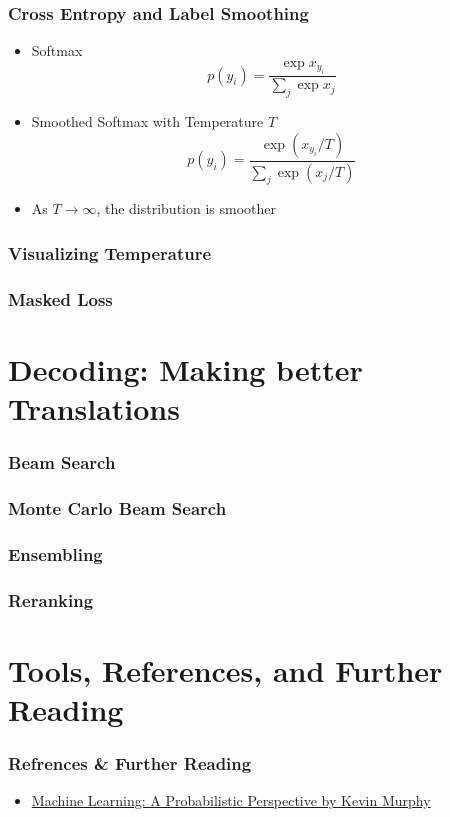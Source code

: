 \documentclass{beamer}
\begin{document}
\begin{frame}
\frametitle{Cross Entropy and Label Smoothing}
\begin{itemize}
  \item Softmax
  \begin{equation*}
    p(y_i) = \frac{\exp x_{y_i}}{\sum_j \exp x_j}
  \end{equation*}
  \item Smoothed Softmax with Temperature $T$
  \begin{equation*}
    p(y_i) = \frac{\exp \left(x_{y_i} / T \right)}{\sum_j \exp \left(x_j / T \right)}
  \end{equation*}
  \item As $T \to \infty$, the distribution is smoother
\end{itemize}
\end{frame}

\begin{frame}
\frametitle{Visualizing Temperature}

\end{frame}

\begin{frame}
\frametitle{Masked Loss}

\end{frame}


\section{Decoding: Making better Translations}

\begin{frame}
\frametitle{Beam Search}

\end{frame}

\begin{frame}
\frametitle{Monte Carlo Beam Search}

\end{frame}

\begin{frame}
\frametitle{Ensembling}

\end{frame}

\begin{frame}
\frametitle{Reranking}

\end{frame}


\section{Tools, References, and Further Reading}


\begin{frame}
\frametitle{Refrences \& Further Reading}
  \begin{itemize}
    \item \href{https://www.cs.ubc.ca/~murphyk/MLbook/}{Machine Learning: A Probabilistic Perspective by Kevin Murphy}
  \end{itemize}
\end{frame}


\end{document}
